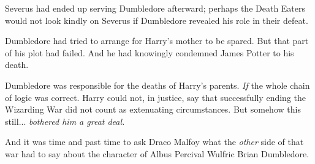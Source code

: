 Severus had ended up serving Dumbledore afterward; perhaps the Death Eaters would not look kindly on Severus if Dumbledore revealed his role in their defeat.

Dumbledore had tried to arrange for Harry's mother to be spared. But that part of his plot had failed. And he had knowingly condemned James Potter to his death.

Dumbledore was responsible for the deaths of Harry's parents. \emph{If} the whole chain of logic was correct. Harry could not, in justice, say that successfully ending the Wizarding War did not count as extenuating circumstances. But somehow this still... \emph{bothered him a great deal.}

And it was time and past time to ask Draco Malfoy what the \emph{other} side of that war had to say about the character of Albus Percival Wulfric Brian Dumbledore.
